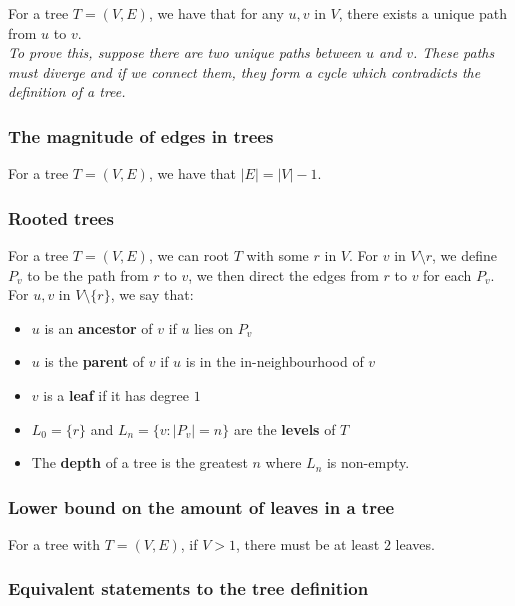 \documentclass[a4paper, 12pt, twoside]{article}
\begin{document}
For a tree $T = (V, E)$, we have that for any $u, v$ in $V$, there
exists a unique path from $u$ to $v$.
\\[\baselineskip]
\textit{To prove this, suppose there are two unique paths between
$u$ and $v$. These paths must diverge and if we connect them, they
form a cycle which contradicts the definition of a tree.}

\subsubsection{The magnitude of edges in trees}

For a tree $T = (V, E)$, we have that $|E| = |V| - 1$.

\subsubsection{Rooted trees}

For a tree $T = (V, E)$, we can root $T$ with some $r$ in $V$.
For $v$ in $V\setminus{r}$, we define $P_v$ to be the path from 
$r$ to $v$, we then direct the edges from $r$ to $v$ for each $P_v$.
\\[\baselineskip]
For $u, v$ in $V\setminus\{r\}$, we say that: \begin{itemize}
  \item $u$ is an \textbf{ancestor} of $v$ if $u$ lies on $P_v$
  \item $u$ is the \textbf{parent} of $v$ if $u$ is in the
  in-neighbourhood of $v$
  \item $v$ is a \textbf{leaf} if it has degree $1$
  \item $L_0 = \{r\}$ and $L_n = \{v : |P_v| = n\}$ are the 
  \textbf{levels} of $T$
  \item The \textbf{depth} of a tree is the greatest $n$ where
  $L_n$ is non-empty.
\end{itemize} 

\subsubsection{Lower bound on the amount of leaves in a tree}

For a tree with $T = (V, E)$, if $V > 1$, there must be at least
$2$ leaves.

\subsubsection{Equivalent statements to the tree definition}
\end{document}
